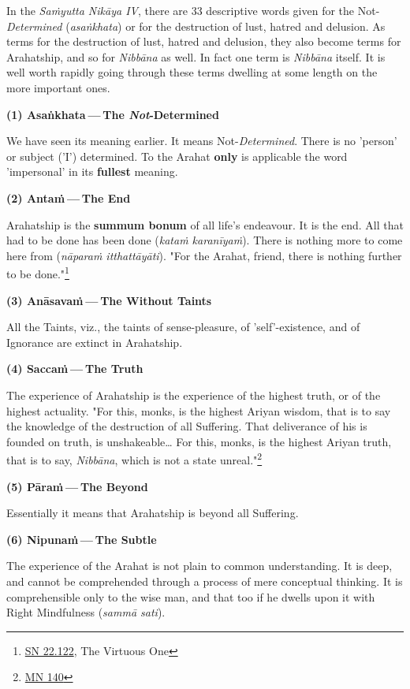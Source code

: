 In the \emph{Saṁyutta Nikāya IV}, there are 33 descriptive words given for the Not-\emph{Determined} (\emph{asaṅkhata}) or for the destruction of lust, hatred and delusion. As terms for the destruction of lust, hatred and delusion, they also become terms for Arahatship, and so for \emph{Nibbāna} as well. In fact one term is \emph{Nibbāna} itself. It is well worth rapidly going through these terms dwelling at some length on the more important ones.

\textbf{(1) Asaṅkhata --- The \emph{Not}-Determined}

We have seen its meaning earlier. It means Not-\emph{Determined}. There is no 'person' or subject ('I') determined. To the Arahat \textbf{only} is applicable the word 'impersonal' in its \textbf{fullest} meaning.

\textbf{(2) Antaṁ --- The End}

Arahatship is the \textbf{summum bonum} of all life's endeavour. It is the end. All that had to be done has been done (\emph{kataṁ karanīyaṁ}). There is nothing more to come here from (\emph{nāparaṁ itthattāyāti}). "For the Arahat, friend, there is nothing further to be done."\footnote{\href{https://suttacentral.net/sn22.122/en/suddhaso}{SN 22.122}, The Virtuous One}

\textbf{(3) Anāsavaṁ --- The Without Taints}

All the Taints, viz., the taints of sense-pleasure, of 'self'-existence, and of Ignorance are extinct in Arahatship.

\textbf{(4) Saccaṁ --- The Truth}

The experience of Arahatship is the experience of the highest truth, or of the highest actuality. "For this, monks, is the highest Ariyan wisdom, that is to say the knowledge of the destruction of all Suffering. That deliverance of his is founded on truth, is unshakeable\ldots\hspace{0pt} For this, monks, is the highest Ariyan truth, that is to say, \emph{Nibbāna}, which is not a state unreal."\footnote{\href{https://suttacentral.net/mn140/en/bodhi}{MN 140}}

\textbf{(5) Pāraṁ --- The Beyond}

\protect\hypertarget{beyond}{}{}Essentially it means that Arahatship is beyond all Suffering.

\textbf{(6) Nipunaṁ --- The Subtle}

The experience of the Arahat is not plain to common understanding. It is deep, and cannot be comprehended through a process of mere conceptual thinking. It is comprehensible only to the wise man, and that too if he dwells upon it with Right Mindfulness (\emph{sammā sati}).

